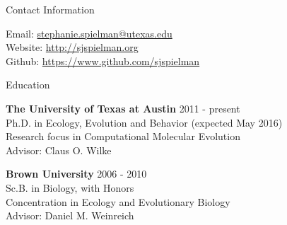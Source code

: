 \documentclass{resume} %
\begin{document}

\begin{rSection}{Contact Information}

\vspace*{0.5cm}

Email: \href{mailto:stephanie.spielman@utexas.edu}{stephanie.spielman@utexas.edu} \\
Website: \url{http://sjspielman.org} \\ 
Github: \url{https://www.github.com/sjspielman} \\ 

\end{rSection}



\begin{rSection}{Education}
	
\vspace*{0.5cm}

{\bf The University of Texas at Austin} \hfill {2011 - present} \\ 
Ph.D. in Ecology, Evolution and Behavior (expected May 2016) \\
Research focus in Computational Molecular Evolution \\
Advisor: Claus O. Wilke \\

\smallskip

{\bf Brown University} \hfill {2006 - 2010} \\ 
Sc.B. in Biology, with Honors \\
Concentration in Ecology and Evolutionary Biology \\
Advisor: Daniel M. Weinreich \\



\end{rSection}

\end{document}
